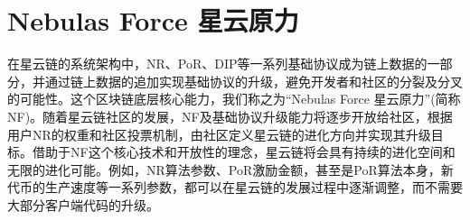 \section{Nebulas Force 星云原力}
在星云链的系统架构中，NR、PoR、DIP等一系列基础协议成为链上数据的一部分，并通过链上数据的追加实现基础协议的升级，避免开发者和社区的分裂及分叉的可能性。这个区块链底层核心能力，我们称之为“Nebulas Force 星云原力”(简称NF)。随着星云链社区的发展，NF及基础协议升级能力将逐步开放给社区，根据用户NR的权重和社区投票机制，由社区定义星云链的进化方向并实现其升级目标。借助于NF这个核心技术和开放性的理念，星云链将会具有持续的进化空间和无限的进化可能。例如，NR算法参数、PoR激励金额，甚至是PoR算法本身，新代币的生产速度等一系列参数，都可以在星云链的发展过程中逐渐调整，而不需要大部分客户端代码的升级。
